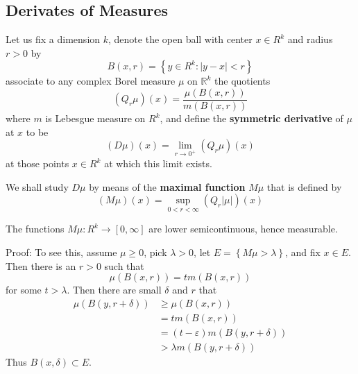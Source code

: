 \documentclass[12pt, a4paper, oneside]{book}
\begin{document}
\subsection{Derivates of Measures}
\begin{definition}
    Let us fix a dimension $k$, denote the open ball with center $x \in R^k$ and radius $r>0$ by
    \begin{equation*}
        B(x, r)
        =
        \left\{y \in R^k:|y-x|<r\right\}
    \end{equation*}
    associate to any complex Borel measure $\mu$ on $\mathbb{R}^k$ the quotients
    $$
        \left(Q_r \mu\right)(x)=\frac{\mu(B(x, r))}{m(B(x, r))}
    $$
    where $m$ is Lebesgue measure on $R^k$, and define the \textbf{symmetric derivative} of $\mu$ at $x$ to be
    \begin{equation*}
        (D \mu)(x)
        =
        \lim _{r \rightarrow 0^+}\left(Q_r \mu\right)(x)
    \end{equation*}
    at those points $x \in R^k$ at which this limit exists.

    We shall study $D \mu$ by means of the \textbf{maximal function} $M \mu$ that  is defined by
    $$
        (M \mu)(x)=\sup _{0<r<\infty}\left(Q_r \left|\mu\right|\right)(x)
    $$
\end{definition}

\begin{theorem}
    The functions $M \mu: R^k \rightarrow[0, \infty]$ are lower semicontinuous, hence measurable.

    Proof:
    To see this, assume $\mu \geq 0$, pick $\lambda>0$, let $E=\left\{M \mu>\lambda\right\}$, and fix $x \in E$. Then there is an $r>0$ such that
    $$
        \mu(B(x, r))=tm(B(x, r))
    $$
    for some $t>\lambda$. Then there are small $\delta$ and $r$ that
    $$
        \begin{aligned}
            \mu(B(y, r+\delta)) & \geq \mu (B(x,r))                  \\
                                & = tm(B(x, r))                      \\
                                & =(t-\varepsilon) m(B(y, r+\delta)) \\
                                & >\lambda m(B(y, r+\delta))
        \end{aligned}
    $$
    Thus $B(x, \delta) \subset E$.
\end{theorem}
\end{document}
